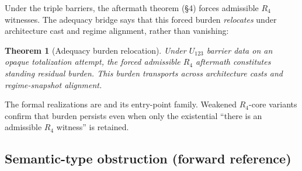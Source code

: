 \documentclass[11pt]{article}
\theoremstyle{plain}
\newtheorem{theorem}{Theorem}[section]
\theoremstyle{definition}
\theoremstyle{remark}
\begin{document}
Under the triple barriers, the aftermath theorem (\S4) forces admissible \(R_4\) witnesses. The adequacy bridge says that this forced burden \emph{relocates} under architecture cast and regime alignment, rather than vanishing:

\begin{theorem}[Adequacy burden relocation]
Under \(U_{123}\) barrier data on an opaque totalization attempt, the forced admissible \(R_4\) aftermath constitutes standing residual burden. This burden transports across architecture casts and regime-snapshot alignment.
\end{theorem}

\noindent\begingroup\sloppy
The formal realizations are  and its entry-point family.\linebreak
Weakened \(R_4\)-core variants confirm that burden persists even when only the existential ``there is an admissible \(R_4\) witness'' is retained.
\par\endgroup

\subsection{Semantic-type obstruction (forward reference)}
\end{document}
